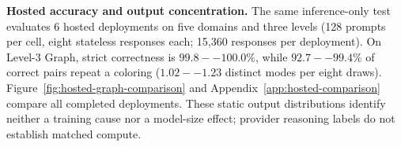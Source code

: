 \noindent\textbf{Hosted accuracy and output concentration.}
\label{sec:hosted-concentration}
The same inference-only test evaluates 6 hosted deployments on five domains
and three levels (128 prompts per cell, eight stateless responses each; 15,360
responses per deployment). On Level-3 Graph, strict correctness is
$99.8--100.0\%$, while $92.7--99.4\%$ of correct pairs repeat a coloring
($1.02--1.23$ distinct modes per eight draws). Figure~\ref{fig:hosted-graph-comparison}
and Appendix~\ref{app:hosted-comparison} compare all completed deployments.
These static output distributions identify neither a training cause nor a
model-size effect; provider reasoning labels do not establish matched compute.
